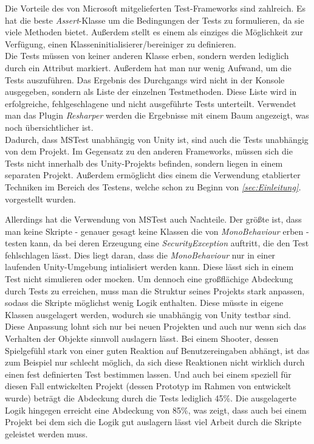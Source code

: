 Die Vorteile des von Microsoft mitgelieferten Test-Frameworks sind zahlreich. Es hat die beste \textit{Assert}-Klasse um die Bedingungen der Tests zu formulieren, da sie viele Methoden bietet. Außerdem stellt es einem als einziges die Möglichkeit zur Verfügung, einen Klasseninitialisierer/bereiniger zu definieren.\\
Die Tests müssen von keiner anderen Klasse erben, sondern werden lediglich durch ein Attribut markiert. Außerdem hat man nur wenig Aufwand, um die Tests auszuführen. Das Ergebnis des Durchgangs wird nicht in der Konsole ausgegeben, sondern als Liste der einzelnen Testmethoden. Diese Liste wird in erfolgreiche, fehlgeschlagene und nicht ausgeführte Tests unterteilt. Verwendet man das Plugin \textit{Resharper} werden die Ergebnisse mit einem Baum angezeigt, was noch übersichtlicher ist.\\
Dadurch, dass MSTest unabhängig von Unity ist, sind auch die Tests unabhängig von dem Projekt. Im Gegensatz zu den anderen Frameworks, müssen sich die Tests nicht innerhalb des Unity-Projekts befinden, sondern liegen in einem separaten Projekt. Außerdem ermöglicht dies einem die Verwendung etablierter Techniken im Bereich des Testens, welche schon zu Beginn von \textit{\ref{sec:Einleitung}. } vorgestellt wurden.

Allerdings hat die Verwendung von MSTest auch Nachteile. Der größte ist, dass man keine Skripte - genauer gesagt keine Klassen die von \textit{MonoBehaviour} erben - testen kann, da bei deren Erzeugung eine \textit{SecurityException} auftritt, die den Test fehlschlagen lässt. Dies liegt daran, dass die \textit{MonoBehaviour} nur in einer laufenden Unity-Umgebung intialisiert werden kann. Diese lässt sich in einem Test nicht simulieren oder mocken. Um dennoch eine großflächige Abdeckung durch Tests zu erreichen, muss man die Struktur seines Projekts stark anpassen, sodass die Skripte möglichst wenig Logik enthalten. Diese müsste in eigene Klassen ausgelagert werden, wodurch sie unabhängig von Unity testbar sind. Diese Anpassung lohnt sich nur bei neuen Projekten und auch nur wenn sich das Verhalten der Objekte sinnvoll auslagern lässt. Bei einem Shooter, dessen Spielgefühl stark von einer guten Reaktion auf Benutzereingaben abhängt, ist das zum Beispiel nur schlecht möglich, da sich diese Reaktionen nicht wirklich durch einen fest definierten Test bestimmen lassen. Und auch bei einem speziell für diesen Fall entwickelten Projekt (dessen Prototyp im Rahmen von \cite{TDGD13} entwickelt wurde) beträgt die Abdeckung durch die Tests lediglich 45\%. Die ausgelagerte Logik hingegen erreicht eine Abdeckung von 85\%, was zeigt, dass auch bei einem Projekt bei dem sich die Logik gut auslagern lässt viel Arbeit durch die Skripte geleistet werden muss.

